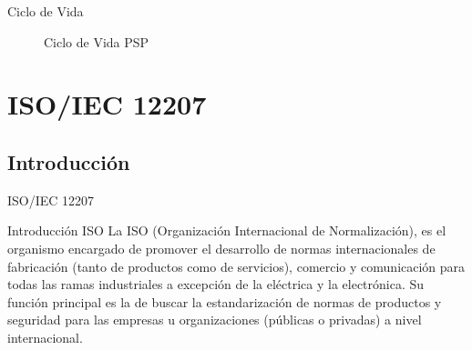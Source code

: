 \documentclass{beamer}
\begin{document}
			\begin{frame}{Ciclo de Vida}
				\begin{figure}								
					 \caption{Ciclo de Vida PSP}
				\end{figure}			
			\end{frame}
			
			
			
			
\section{ISO/IEC 12207}
		\subsection{Introducci\'on}
		
			\begin{frame}
				\begin{center}
					\begin{block}{}
						\begin{center}
							{\huge ISO/IEC 12207}
						\end{center}
					\end{block}
				\end{center}
			\end{frame}					
		
			\begin{frame}{Introducci\'on ISO}
				La ISO (Organización Internacional de Normalización), es el organismo encargado de promover el desarrollo de normas internacionales de fabricación (tanto de productos como de servicios), comercio y comunicación para todas las ramas industriales a excepción de la eléctrica y la electrónica. Su función principal es la de buscar la estandarización de normas de productos y seguridad para las empresas u organizaciones (públicas o privadas) a nivel internacional.\\ \smallskip
			\end{frame}
		
\end{document}
